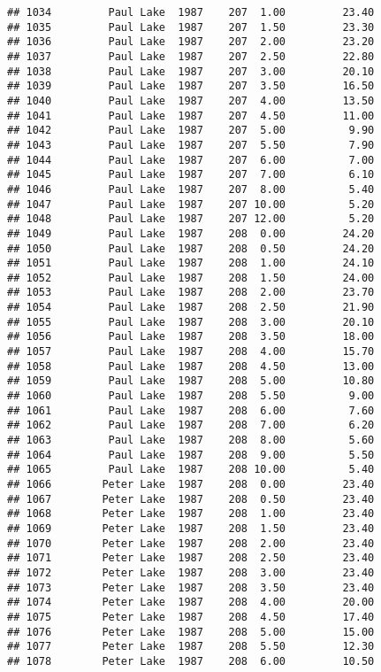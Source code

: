 \documentclass[
]{article}
\begin{document}
\begin{verbatim}
## 1034         Paul Lake  1987    207  1.00         23.40
## 1035         Paul Lake  1987    207  1.50         23.30
## 1036         Paul Lake  1987    207  2.00         23.20
## 1037         Paul Lake  1987    207  2.50         22.80
## 1038         Paul Lake  1987    207  3.00         20.10
## 1039         Paul Lake  1987    207  3.50         16.50
## 1040         Paul Lake  1987    207  4.00         13.50
## 1041         Paul Lake  1987    207  4.50         11.00
## 1042         Paul Lake  1987    207  5.00          9.90
## 1043         Paul Lake  1987    207  5.50          7.90
## 1044         Paul Lake  1987    207  6.00          7.00
## 1045         Paul Lake  1987    207  7.00          6.10
## 1046         Paul Lake  1987    207  8.00          5.40
## 1047         Paul Lake  1987    207 10.00          5.20
## 1048         Paul Lake  1987    207 12.00          5.20
## 1049         Paul Lake  1987    208  0.00         24.20
## 1050         Paul Lake  1987    208  0.50         24.20
## 1051         Paul Lake  1987    208  1.00         24.10
## 1052         Paul Lake  1987    208  1.50         24.00
## 1053         Paul Lake  1987    208  2.00         23.70
## 1054         Paul Lake  1987    208  2.50         21.90
## 1055         Paul Lake  1987    208  3.00         20.10
## 1056         Paul Lake  1987    208  3.50         18.00
## 1057         Paul Lake  1987    208  4.00         15.70
## 1058         Paul Lake  1987    208  4.50         13.00
## 1059         Paul Lake  1987    208  5.00         10.80
## 1060         Paul Lake  1987    208  5.50          9.00
## 1061         Paul Lake  1987    208  6.00          7.60
## 1062         Paul Lake  1987    208  7.00          6.20
## 1063         Paul Lake  1987    208  8.00          5.60
## 1064         Paul Lake  1987    208  9.00          5.50
## 1065         Paul Lake  1987    208 10.00          5.40
## 1066        Peter Lake  1987    208  0.00         23.40
## 1067        Peter Lake  1987    208  0.50         23.40
## 1068        Peter Lake  1987    208  1.00         23.40
## 1069        Peter Lake  1987    208  1.50         23.40
## 1070        Peter Lake  1987    208  2.00         23.40
## 1071        Peter Lake  1987    208  2.50         23.40
## 1072        Peter Lake  1987    208  3.00         23.40
## 1073        Peter Lake  1987    208  3.50         23.40
## 1074        Peter Lake  1987    208  4.00         20.00
## 1075        Peter Lake  1987    208  4.50         17.40
## 1076        Peter Lake  1987    208  5.00         15.00
## 1077        Peter Lake  1987    208  5.50         12.30
## 1078        Peter Lake  1987    208  6.00         10.50

\end{verbatim}
\end{document}
